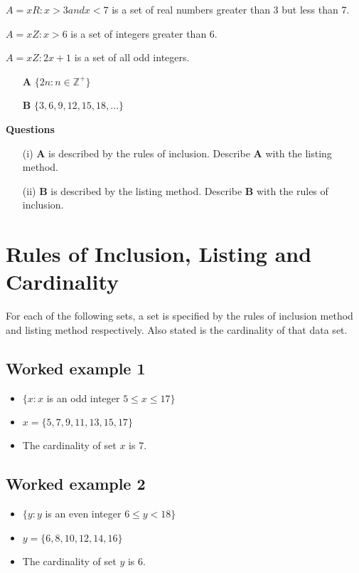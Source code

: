 \documentclass[11pt,a4paper,titlepage,oneside,openany]{article}
\numberwithin{equation}{section}
\numberwithin{algorithm}{section}
\numberwithin{figure}{section}
\numberwithin{table}{section}
\begin{document}
$A = {x   R: x > 3 and x < 7}$ is a set of real numbers greater than 3 but less than 7.

$A = {x   Z: x > 6}$ is a set of integers greater than 6.

$A = {x   Z: 2x + 1}$ is a set of all odd integers.


\begin{itemize}
\item[\textbf{A}] $ \{ 2n : n \in \mathbb{Z^{+}} \} $
\item[\textbf{B}] $ \{ 3,6,9,12,15,18,\ldots \} $
\end{itemize}
\textbf{Questions}
\begin{itemize}
\item[(i)] \textbf{A} is described by the rules of inclusion. Describe \textbf{A} with the listing method.
\item[(ii)] \textbf{B} is described by the listing method. Describe \textbf{B} with the rules of inclusion. 
\end{itemize}




\section*{Rules of Inclusion, Listing and Cardinality}
For each of the following sets, a set is specified by the rules of inclusion method and listing method respectively. Also stated is the cardinality of that data set.
\subsection*{Worked example 1}
\begin{itemize}
\item $\{ x : x $ is an odd integer $ 5 \leq x \leq 17 \}$
\item $x = \{5,7,9,11,13,15,17\}$
\item The cardinality of set $x$ is 7.
\end{itemize}

\subsection*{Worked example 2}
\begin{itemize}
\item $\{ y : y $ is an even integer $ 6 \leq y < 18 \}$
\item $y = \{6,8,10,12,14,16\}$
\item The cardinality of set $y$ is 6.
\end{itemize}
\end{document}

